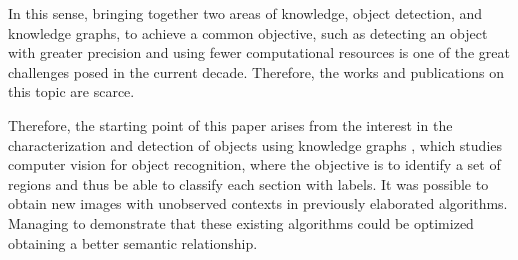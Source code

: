 In this sense, bringing together two areas of knowledge, object detection, and knowledge graphs, to achieve a common objective, such as detecting an object with greater precision and using fewer computational resources is one of the great challenges posed in the current decade. Therefore, the works and publications on this topic are scarce.

Therefore, the starting point of this paper arises from the interest in the characterization and detection of objects using knowledge graphs \cite{Fang}, which studies computer vision for object recognition, where the objective is to identify a set of regions and thus be able to classify each section with labels. It was possible to obtain new images with unobserved contexts in previously elaborated algorithms. Managing to demonstrate that these existing algorithms could be optimized obtaining a better semantic relationship.
